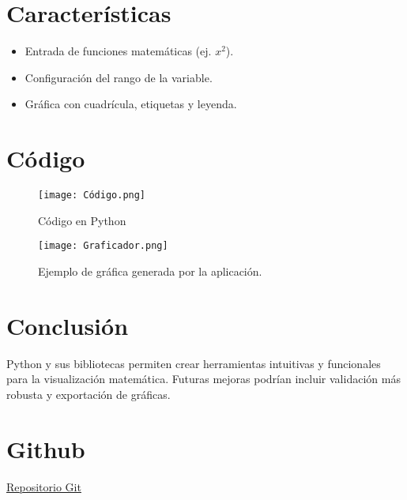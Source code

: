 \documentclass[12pt]{article}
\begin{document}
\section{Características}

\begin{itemize}
    \item Entrada de funciones matemáticas (ej. \( x^2 \)).
    \item Configuración del rango de la variable.
    \item Gráfica con cuadrícula, etiquetas y leyenda.
\end{itemize}

\section{Código}
\begin{figure}[h!]
    \centering
    \texttt{[image: Código.png]}
    \caption{Código en Python}
    \label{fig:ejemplo-grafica}
\end{figure}


\begin{figure}[h!]
    \centering
    \texttt{[image: Graficador.png]}
    \caption{Ejemplo de gráfica generada por la aplicación.}
    \label{fig:ejemplo-grafica}
\end{figure}

\section{Conclusión}

\noindent Python y sus bibliotecas permiten crear herramientas intuitivas y funcionales para la visualización matemática. Futuras mejoras podrían incluir validación más robusta y exportación de gráficas.

\section*{Github}
\href{https://github.com/BufonMestizo/metodos_de_optimizacion/blob/master/TRABAJO%20NRO%20001.py}{Repositorio Git}
\end{document}
